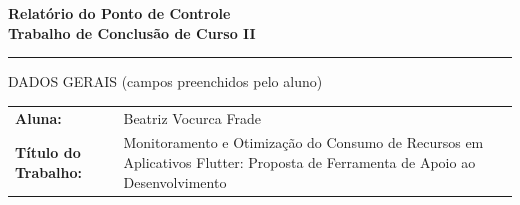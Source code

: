 \documentclass[12pt,a4paper]{article}
\begin{document}
\begin{tcolorbox}[
  enhanced,
  colback=secondary,
  colframe=primary,
  boxrule=1pt,
  arc=2mm,
  left=5mm,
  right=5mm,
  top=4mm,
  bottom=4mm
]
\begin{center}
{\Large \textbf{Relatório do Ponto de Controle}}\\[0.15cm]
{\large \textbf{Trabalho de Conclusão de Curso II}}\\[0.25cm]
\textcolor{primary}{\rule{0.65\linewidth}{0.7pt}}
\end{center}
\end{tcolorbox}

\begin{sectionbox}{DADOS GERAIS (campos preenchidos pelo aluno)}
\renewcommand{\arraystretch}{1.3}
\begin{tabularx}{\textwidth}{>{\bfseries}p{3.2cm} X}
Aluna: & Beatriz Vocurca Frade \\
Título do Trabalho: & Monitoramento e Otimização do Consumo de Recursos em Aplicativos Flutter: Proposta de Ferramenta de Apoio ao Desenvolvimento \\
\end{tabularx}
\end{sectionbox}
\end{document}
